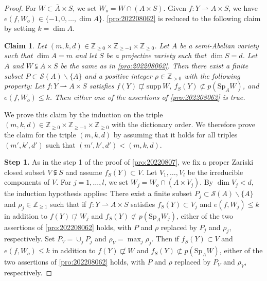 \documentclass[11pt,english]{smfart}
\theoremstyle{plain}
\newtheorem{claim}[thm]{Claim}
\theoremstyle{definition}
\theoremstyle{remark}
\numberwithin{equation}{section}
\theoremstyle{plain}
\newcommand{\da}{\rightharpoonup}
\begin{document}
	\begin{proof}
		For $W\subset \overline{A}\times S$, we set $W_o=W\cap (A\times S)$.
		Given $f:Y\da A\times S$, we have $e(f,W_o)\in\{-1,0,\ldots,\dim A\}$.
		\cref{pro:202208062} is reduced to the following claim by setting $k=\dim A$.
		
		
		\begin{claim}
		Let $(m,k,d)\in\mathbb Z_{\geq 0}\times \mathbb Z_{\geq -1}\times\mathbb Z_{\geq 0}$.
		Let $A$ be a semi-Abelian variety such that $\dim A=m$ and let $S$ be a projective variety such that $\dim S=d$.
		Let $\overline{A}$ and $W\subsetneqq \overline{A}\times S$ be the same as in \cref{pro:202208062}.
		Then there exist a finite subset $P\subset \mathcal{S}(A)\backslash\{A\}$ and a positive integer $\rho\in\mathbb Z_{>0}$ with the following property:
		Let $f:Y\da A\times S$ satisfies $f(Y)\not\sqsubset \mathrm{supp}\, W$, $f_S(Y)\not\subset p(\mathrm{Sp}_AW)$, and $e(f,W_o)\leq k$.
Then either one of the assertions of \cref{pro:202208062} is true.
		\end{claim}
		
		
		
		We prove this claim by the induction on the triple $(m,k,d)\in\mathbb Z_{\geq 0}\times \mathbb Z_{\geq -1}\times\mathbb Z_{\geq 0}$ with the dictionary order.  
		We therefore prove the claim for the triple $(m,k,d)$ by assuming that it holds for all triples $(m',k',d')$ such that $(m',k',d')<(m,k,d)$.
		
	
	
	\textbf{Step 1.}	
		As in the step 1 of the proof of \cref{pro:20220807}, we fix a proper Zariski closed subset $V\subsetneqq S$ and assume $f_S(Y)\subset V$.
Let $V_1,\ldots ,V_l$ be the irreducible components of $V$.
		For $j=1,\ldots ,l$, we set $W_j=W_o\cap (A\times V_j)$.
		By $\dim V_j<d$, the induction hypothesis applies: 
		There exist a finite subset $P_{j}\subset \mathcal{S}(A)\backslash \{A\}$ and $\rho_{j}\in\mathbb Z_{\geq 1}$ such that if $f:Y\da A\times S$ satisfies $f_S(Y)\subset V_j$ and $e(f,W_j)\leq k$ in addition to $f(Y)\not\sqsubset W_j$ and $f_S(Y)\not\subset p(\mathrm{Sp}_AW_j)$, either of the two assertions of \cref{pro:202208062} holds, with $P$ and $\rho$ replaced by $P_{j}$ and $\rho_{j}$, respectively.
		Set $P_{V}=\cup_jP_{j}$ and $\rho_{V}=\max_{j}\rho_{j}$.
		Then if $f_S(Y)\subset V$ and $e(f,W_o)\leq k$ in addition to $f(Y)\not\sqsubset W$ and $f_S(Y)\not\subset p(\mathrm{Sp}_AW)$, either of the two assertions of \cref{pro:202208062} holds, with $P$ and $\rho$ replaced by $P_{V}$ and $\rho_{V}$, respectively.
		

\end{proof}
\end{document}
